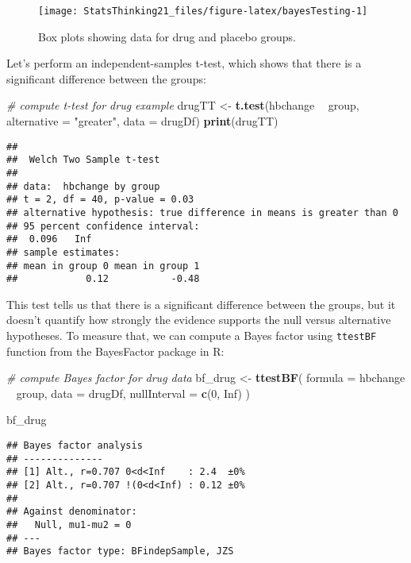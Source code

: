 \documentclass[]{book}
\newenvironment{Shaded}{\begin{snugshade}}{\end{snugshade}}
\newcommand{\KeywordTok}[1]{\textcolor[rgb]{0.13,0.29,0.53}{\textbf{#1}}}
\newcommand{\DataTypeTok}[1]{\textcolor[rgb]{0.13,0.29,0.53}{#1}}
\newcommand{\DecValTok}[1]{\textcolor[rgb]{0.00,0.00,0.81}{#1}}
\newcommand{\StringTok}[1]{\textcolor[rgb]{0.31,0.60,0.02}{#1}}
\newcommand{\CommentTok}[1]{\textcolor[rgb]{0.56,0.35,0.01}{\textit{#1}}}
\newcommand{\OtherTok}[1]{\textcolor[rgb]{0.56,0.35,0.01}{#1}}
\newcommand{\OperatorTok}[1]{\textcolor[rgb]{0.81,0.36,0.00}{\textbf{#1}}}
\newcommand{\NormalTok}[1]{#1}
\theoremstyle{definition}
\theoremstyle{definition}
\theoremstyle{definition}
\theoremstyle{remark}
\begin{document}
\begin{figure}
\texttt{[image: StatsThinking21\_files/figure-latex/bayesTesting-1]} \caption{Box plots showing data for drug and placebo groups.}\label{fig:bayesTesting}
\end{figure}

Let's perform an independent-samples t-test, which shows that there is a
significant difference between the groups:

\begin{Shaded}
\begin{Highlighting}[]
\CommentTok{# compute t-test for drug example}
\NormalTok{drugTT <-}\StringTok{ }\KeywordTok{t.test}\NormalTok{(hbchange }\OperatorTok{~}\StringTok{ }\NormalTok{group, }\DataTypeTok{alternative =} \StringTok{"greater"}\NormalTok{, }\DataTypeTok{data =}\NormalTok{ drugDf)}
\KeywordTok{print}\NormalTok{(drugTT)}
\end{Highlighting}
\end{Shaded}

\begin{verbatim}
## 
##  Welch Two Sample t-test
## 
## data:  hbchange by group
## t = 2, df = 40, p-value = 0.03
## alternative hypothesis: true difference in means is greater than 0
## 95 percent confidence interval:
##  0.096   Inf
## sample estimates:
## mean in group 0 mean in group 1 
##            0.12           -0.48
\end{verbatim}

This test tells us that there is a significant difference between the
groups, but it doesn't quantify how strongly the evidence supports the
null versus alternative hypotheses. To measure that, we can compute a
Bayes factor using \texttt{ttestBF} function from the BayesFactor
package in R:

\begin{Shaded}
\begin{Highlighting}[]
\CommentTok{# compute Bayes factor for drug data}
\NormalTok{bf_drug <-}\StringTok{ }\KeywordTok{ttestBF}\NormalTok{(}
  \DataTypeTok{formula =}\NormalTok{ hbchange }\OperatorTok{~}\StringTok{ }\NormalTok{group, }\DataTypeTok{data =}\NormalTok{ drugDf,}
  \DataTypeTok{nullInterval =} \KeywordTok{c}\NormalTok{(}\DecValTok{0}\NormalTok{, }\OtherTok{Inf}\NormalTok{)}
\NormalTok{)}

\NormalTok{bf_drug}
\end{Highlighting}
\end{Shaded}

\begin{verbatim}
## Bayes factor analysis
## --------------
## [1] Alt., r=0.707 0<d<Inf    : 2.4  ±0%
## [2] Alt., r=0.707 !(0<d<Inf) : 0.12 ±0%
## 
## Against denominator:
##   Null, mu1-mu2 = 0 
## ---
## Bayes factor type: BFindepSample, JZS
\end{verbatim}
\end{document}
